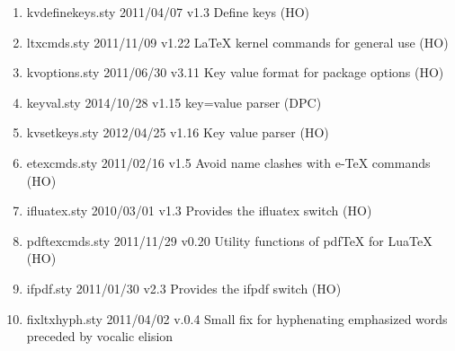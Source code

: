 \begin{enumerate}
\item kvdefinekeys.sty 2011/04/07 v1.3 Define keys (HO)
\item ltxcmds.sty 2011/11/09 v1.22 LaTeX kernel commands for general use (HO)
\item kvoptions.sty 2011/06/30 v3.11 Key value format for package options (HO)
\item keyval.sty 2014/10/28 v1.15 key=value parser (DPC)
\item kvsetkeys.sty 2012/04/25 v1.16 Key value parser (HO)
\item etexcmds.sty 2011/02/16 v1.5 Avoid name clashes with e-TeX commands (HO)
\item ifluatex.sty 2010/03/01 v1.3 Provides the ifluatex switch (HO)
\item pdftexcmds.sty 2011/11/29 v0.20 Utility functions of pdfTeX for LuaTeX (HO)
\item ifpdf.sty 2011/01/30 v2.3 Provides the ifpdf switch (HO)
\item fixltxhyph.sty 2011/04/02 v.0.4 Small fix for hyphenating emphasized words preceded by vocalic elision
\end{enumerate}
